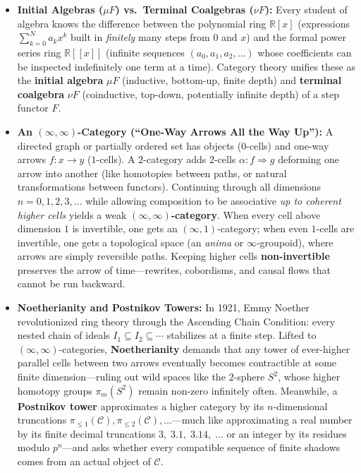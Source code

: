 \documentclass[10pt,twoside,openright]{book}
\theoremstyle{crmplain}
\theoremstyle{crmdef}
\theoremstyle{crmremark}
\begin{document}
\begin{itemize}
  \item \textbf{Initial Algebras ($\mu F$) vs.\ Terminal Coalgebras ($\nu F$):} Every student of algebra knows the difference between the polynomial ring $\mathbb{R}[x]$ (expressions $\sum_{k=0}^N a_k x^k$ built in \emph{finitely} many steps from $0$ and $x$) and the formal power series ring $\mathbb{R}[[x]]$ (infinite sequences $(a_0, a_1, a_2, \dots)$ whose coefficients can be inspected indefinitely one term at a time). Category theory unifies these as the \textbf{initial algebra} $\mu F$ (inductive, bottom-up, finite depth) and \textbf{terminal coalgebra} $\nu F$ (coinductive, top-down, potentially infinite depth) of a step functor $F$.
  \item \textbf{An $(\infty, \infty)$-Category (``One-Way Arrows All the Way Up''):} A directed graph or partially ordered set has objects ($0$-cells) and one-way arrows $f : x \to y$ ($1$-cells). A $2$-category adds $2$-cells $\alpha : f \Rightarrow g$ deforming one arrow into another (like homotopies between paths, or natural transformations between functors). Continuing through all dimensions $n = 0, 1, 2, 3, \dots$ while allowing composition to be associative \emph{up to coherent higher cells} yields a weak \textbf{$(\infty, \infty)$-category}. When every cell above dimension $1$ is invertible, one gets an $(\infty, 1)$-category; when even $1$-cells are invertible, one gets a topological space (an \emph{anima} or $\infty$-groupoid), where arrows are simply reversible paths. Keeping higher cells \textbf{non-invertible} preserves the arrow of time---rewrites, cobordisms, and causal flows that cannot be run backward.
  \item \textbf{Noetherianity and Postnikov Towers:} In 1921, Emmy Noether revolutionized ring theory through the Ascending Chain Condition: every nested chain of ideals $I_1 \subseteq I_2 \subseteq \cdots$ stabilizes at a finite step. Lifted to $(\infty, \infty)$-categories, \textbf{Noetherianity} demands that any tower of ever-higher parallel cells between two arrows eventually becomes contractible at some finite dimension---ruling out wild spaces like the $2$-sphere $S^2$, whose higher homotopy groups $\pi_m(S^2)$ remain non-zero infinitely often. Meanwhile, a \textbf{Postnikov tower} approximates a higher category by its $n$-dimensional truncations $\pi_{\le 1}(\mathcal{C}), \pi_{\le 2}(\mathcal{C}), \dots$---much like approximating a real number by its finite decimal truncations $3,\; 3.1,\; 3.14,\; \dots$ or an integer by its residues modulo $p^n$---and asks whether every compatible sequence of finite shadows comes from an actual object of $\mathcal{C}$.
\end{itemize}
\end{document}
